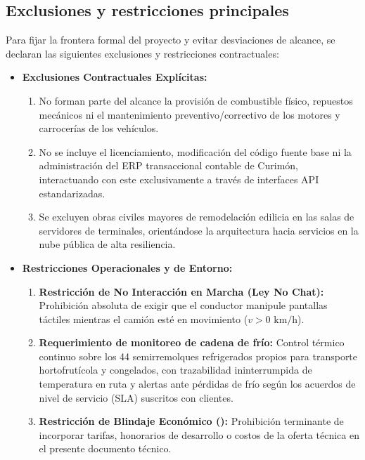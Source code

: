 \subsection{Exclusiones y restricciones principales}\label{sec:2-exclusiones}

Para fijar la frontera formal del proyecto y evitar desviaciones de alcance, se declaran las siguientes exclusiones y restricciones contractuales:
\begin{itemize}
  \item \textbf{Exclusiones Contractuales Explícitas:}
  \begin{enumerate}
    \item No forman parte del alcance la provisión de combustible físico, repuestos mecánicos ni el mantenimiento preventivo/correctivo de los motores y carrocerías de los vehículos.
    \item No se incluye el licenciamiento, modificación del código fuente base ni la administración del ERP transaccional contable de Curimón, interactuando con este exclusivamente a través de interfaces API estandarizadas.
    \item Se excluyen obras civiles mayores de remodelación edilicia en las salas de servidores de terminales, orientándose la arquitectura hacia servicios en la nube pública de alta resiliencia.
  \end{enumerate}
  \item \textbf{Restricciones Operacionales y de Entorno:}
  \begin{enumerate}
    \item \textbf{Restricción de No Interacción en Marcha (Ley No Chat):} Prohibición absoluta de exigir que el conductor manipule pantallas táctiles mientras el camión esté en movimiento ($v > 0\text{ km/h}$).
    \item \textbf{Requerimiento de monitoreo de cadena de frío:} Control térmico continuo sobre los 44 semirremolques refrigerados propios para transporte hortofrutícola y congelados, con trazabilidad ininterrumpida de temperatura en ruta y alertas ante pérdidas de frío según los acuerdos de nivel de servicio (SLA) suscritos con clientes.
    \item \textbf{Restricción de Blindaje Económico ():} Prohibición terminante de incorporar tarifas, honorarios de desarrollo o costos de la oferta técnica en el presente documento técnico.
  \end{enumerate}
\end{itemize}

